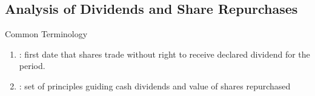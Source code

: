 \subsection{Analysis of Dividends and Share Repurchases}

\begin{definition} Common Terminology
\begin{enumerate}[label=\roman*.]
\setlength{\itemsep}{0pt}
\item {}: first date that shares trade without right to receive declared dividend for the period.
\item {}: set of principles guiding cash dividends and value of shares repurchased
\end{enumerate}
\end{definition}

